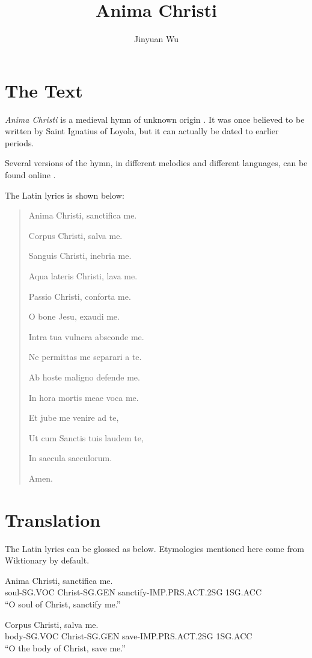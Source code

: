 \documentclass[a4paper]{article}
\title{Anima Christi}
\author{Jinyuan Wu}
\begin{document}
\maketitle

\section{The Text}

\emph{Anima Christi} is a medieval hymn of unknown origin \cite{wiki}. It was once believed to be written by Saint Ignatius of Loyola, but it can actually be dated to earlier periods.

Several versions of the hymn, in different melodies and different languages, can be found online \cite{youtube2,youtube3,youtube1}.

The Latin lyrics is shown below:
\begin{quotation}
    Anima Christi, sanctifica me. 

    Corpus Christi, salva me.
    
    Sanguis Christi, inebria me.
    
    Aqua lateris Christi, lava me.
    
    Passio Christi, conforta me.
    
    O bone Jesu, exaudi me.
    
    Intra tua vulnera absconde me.
    
    Ne permittas me separari a te.
    
    Ab hoste maligno defende me.
    
    In hora mortis meae voca me.
    
    Et jube me venire ad te,
    
    Ut cum Sanctis tuis laudem te,
    
    In saecula saeculorum.
    
    Amen.
\end{quotation}

\section{Translation}

The Latin lyrics can be glossed as below. Etymologies mentioned here come from Wiktionary by default.

\begin{exe}

\sn
\gll Anima        Christi,       sanctifica                me.  \\
     soul-SG.VOC  Christ-SG.GEN  sanctify-IMP.PRS.ACT.2SG  1SG.ACC \\
\glt  ``O soul of Christ, sanctify me.''

\sn
\gll Corpus      Christi,       salva                  me. \\
     body-SG.VOC Christ-SG.GEN  save-IMP.PRS.ACT.2SG   1SG.ACC \\
\glt ``O the body of Christ, save me.''
\end{exe}
\end{document}
